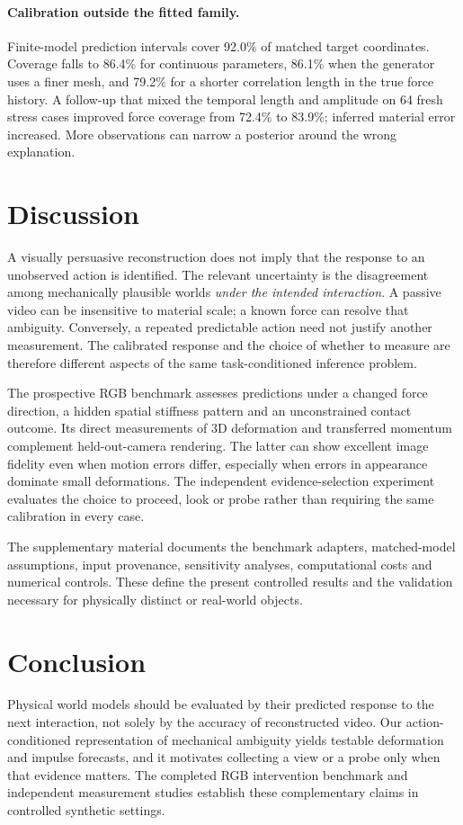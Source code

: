 \documentclass[10pt,twocolumn,letterpaper]{article}
\begin{document}
\paragraph{Calibration outside the fitted family.}
Finite-model prediction intervals cover 92.0\% of matched target coordinates. Coverage falls to 86.4\% for continuous parameters, 86.1\% when the generator uses a finer mesh, and 79.2\% for a shorter correlation length in the true force history. A follow-up that mixed the temporal length and amplitude on 64 fresh stress cases improved force coverage from 72.4\% to 83.9\%; inferred material error increased. More observations can narrow a posterior around the wrong explanation.

\section{Discussion}
A visually persuasive reconstruction does not imply that the response to an unobserved action is identified. The relevant uncertainty is the disagreement among mechanically plausible worlds \emph{under the intended interaction}. A passive video can be insensitive to material scale; a known force can resolve that ambiguity. Conversely, a repeated predictable action need not justify another measurement. The calibrated response and the choice of whether to measure are therefore different aspects of the same task-conditioned inference problem.

The prospective RGB benchmark assesses predictions under a changed force direction, a hidden spatial stiffness pattern and an unconstrained contact outcome. Its direct measurements of 3D deformation and transferred momentum complement held-out-camera rendering. The latter can show excellent image fidelity even when motion errors differ, especially when errors in appearance dominate small deformations. The independent evidence-selection experiment evaluates the choice to proceed, look or probe rather than requiring the same calibration in every case.

The supplementary material documents the benchmark adapters, matched-model assumptions, input provenance, sensitivity analyses, computational costs and numerical controls. These define the present controlled results and the validation necessary for physically distinct or real-world objects.

\section{Conclusion}
Physical world models should be evaluated by their predicted response to the next interaction, not solely by the accuracy of reconstructed video. Our action-conditioned representation of mechanical ambiguity yields testable deformation and impulse forecasts, and it motivates collecting a view or a probe only when that evidence matters. The completed RGB intervention benchmark and independent measurement studies establish these complementary claims in controlled synthetic settings.
\end{document}
